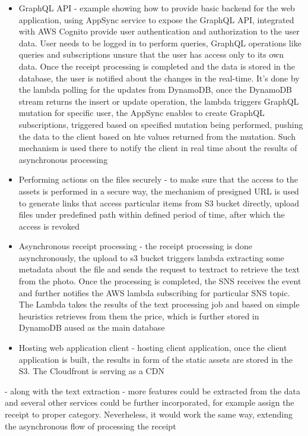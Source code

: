 \begin{itemize}
    \item GraphQL API - example showing how to provide basic backend for the web application, using AppSync service to expose the GraphQL API, integrated with AWS Cognito provide user authentication and authorization to the user data. User needs to be logged in to perform queries, GraphQL operations like queries and subscriptions unsure that the user has access only to its own data. Once the receipt processing is completed and the data is stored in the database, the user is notified about the changes in the real-time. It's done by the lambda polling for the updates from DynamoDB, once the DynamoDB stream returns the insert or update operation, the lambda triggers GraphQL mutation for specific user, the AppSync enables to create GraphQL subscriptions, triggered based on specified mutation being performed, pushing the data to the client based on hte values returned from the mutation. Such mechanism is used there to notify the client in real time about the results of asynchronous processing
    \item Performing actions on the files securely - to make sure that the access to the assets is performed in a secure way, the mechanism of presigned URL is used to generate links that access particular items from S3 bucket directly, upload files under predefined path within defined period of time, after which the access is revoked
    \item Asynchronous receipt processing - the receipt processing is done asynchronously, the upload to s3 bucket triggers lambda extracting some metadata about the file and sends the request to textract to retrieve the text from the photo. Once the processing is completed, the SNS receives the event and further notifies the AWS lambda subscribing for particular SNS topic. The Lambda takes the results of the text processing job and based on simple heuristics retrieves from them the price, which is further stored in DynamoDB aused as the main database
    \item Hosting web application client - hosting client application, once the client application is built, the results in form of the static assets are stored in the S3. The Cloudfront is serving as a CDN
\end{itemize}

- along with the text extraction - more features could be extracted from the data and several other services could be further incorporated, for example assign the receipt to proper category. Neverheless, it would work the same way, extending the asynchronous flow of processing the receipt

